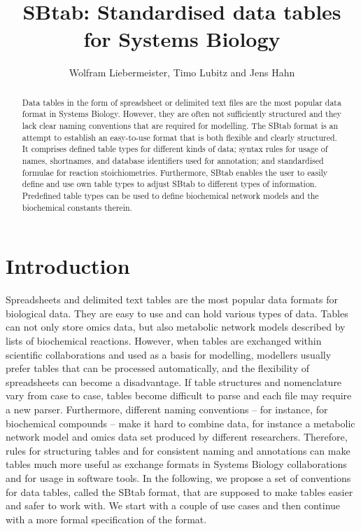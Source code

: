 \documentclass[a4paper]{article}
\begin{document}
\title{SBtab: Standardised data tables  for Systems Biology}

\author{Wolfram Liebermeister, Timo Lubitz and Jens Hahn}
\date{}

\maketitle

\begin{abstract}
  Data tables in the form of spreadsheet or delimited text files are
  the most popular data format in Systems Biology. However, they are
  often not sufficiently structured and they lack clear naming
  conventions that are required for modelling.  The SBtab format is an
  attempt to establish an easy-to-use format that is both flexible and
  clearly structured.  It comprises defined table types for different
  kinds of data; syntax rules for usage of names, shortnames, and
  database identifiers used for annotation; 
  and standardised formulae for reaction stoichiometries. 
  Furthermore, SBtab enables the user to easily define and use own table types to adjust
  SBtab to different types of information.
  Predefined table types can be used to define biochemical network
  models and the biochemical constants therein. 
\end{abstract}

\section{Introduction} 

Spreadsheets and delimited text tables are the most popular data
formats for biological data.  They are easy to use and can hold
various types of data.  Tables can not only store omics data, but also
metabolic network models described by lists of biochemical reactions.
However, when tables are exchanged within scientific collaborations
and used as a basis for modelling, modellers usually prefer tables
that can be processed automatically, and the flexibility of
spreadsheets can become a disadvantage.  If table structures and
nomenclature vary from case to case, tables become difficult to parse
and each file may require a new parser. Furthermore, different naming
conventions -- for instance, for biochemical compounds -- make it
hard to combine data, for instance a metabolic network model and omics
data set produced by different researchers.  Therefore, rules for
structuring tables and for consistent naming and annotations can make
tables much more useful as exchange formats in Systems Biology
collaborations and for usage in software tools.  In the following, we
propose a set of conventions for data tables, called the SBtab format,
that are supposed to make tables easier and safer to work with.  We
start with a couple of use cases and then continue with a more formal
specification of the format.
\end{document}
